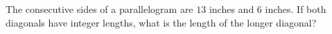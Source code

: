 The consecutive sides of a parallelogram are $13$ inches and $6$ inches. If both diagonals have integer lengths, what is the length of the longer diagonal?
